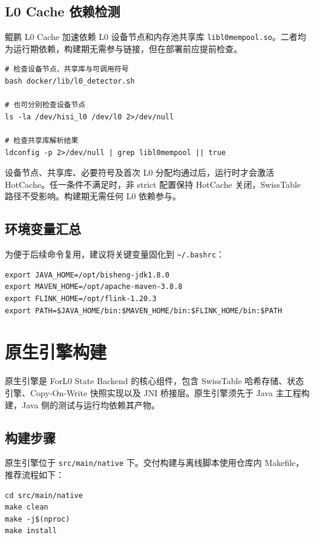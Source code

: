 \documentclass[a4paper,11pt]{article}
\newcommand{\project}{ForL0 State Backend}
\begin{document}
\subsection{L0 Cache 依赖检测}

鲲鹏 L0 Cache 加速依赖 L0 设备节点和内存池共享库 \texttt{libl0mempool.so}。二者均为运行期依赖，构建期无需参与链接，但在部署前应提前检查。

\begin{lstlisting}[language=shellcmd]
# 检查设备节点、共享库与可调用符号
bash docker/lib/l0_detector.sh

# 也可分别检查设备节点
ls -la /dev/hisi_l0 /dev/l0 2>/dev/null

# 检查共享库解析结果
ldconfig -p 2>/dev/null | grep libl0mempool || true
\end{lstlisting}

设备节点、共享库、必要符号及首次 L0 分配均通过后，运行时才会激活 HotCache。任一条件不满足时，非 strict 配置保持 HotCache 关闭，SwissTable 路径不受影响。构建期无需任何 L0 依赖参与。

\subsection{环境变量汇总}

为便于后续命令复用，建议将关键变量固化到 \texttt{\~{}/.bashrc}：

\begin{lstlisting}[language=shellcmd]
export JAVA_HOME=/opt/bisheng-jdk1.8.0
export MAVEN_HOME=/opt/apache-maven-3.8.8
export FLINK_HOME=/opt/flink-1.20.3
export PATH=$JAVA_HOME/bin:$MAVEN_HOME/bin:$FLINK_HOME/bin:$PATH
\end{lstlisting}

\section{原生引擎构建}

原生引擎是 \project{} 的核心组件，包含 SwissTable 哈希存储、状态引擎、Copy-On-Write 快照实现以及 JNI 桥接层。原生引擎须先于 Java 主工程构建，Java 侧的测试与运行均依赖其产物。

\subsection{构建步骤}

原生引擎位于 \texttt{src/main/native} 下。交付构建与离线脚本使用仓库内 Makefile，推荐流程如下：

\begin{lstlisting}[language=shellcmd]
cd src/main/native
make clean
make -j$(nproc)
make install
\end{lstlisting}
\end{document}
